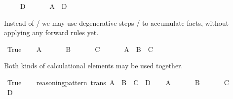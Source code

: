 \begin{isabellebody}
\ \isamarkupfalse%
\ {\isachardoublequote}{\isasymdots}\ {\isasymlongrightarrow}\ D{\isachardoublequote}\ \isamarkupfalse%
\isanewline
\ \ \isamarkupfalse%
\ \isamarkupfalse%
\ {\isachardoublequote}A\ {\isasymlongrightarrow}\ D{\isachardoublequote}\ \isamarkupfalse%
\isacommand{{\isachardot}}\isanewline
\isamarkupfalse%
\isamarkupfalse%
%
\isamarkuptrue%
%
\begin{isamarkuptext}%
Instead of / we may use degenerative steps
  / to accumulate facts, without
  applying any forward rules yet.%
\end{isamarkuptext}%
\isamarkuptrue%
\ True\isanewline
\isamarkupfalse%
\isanewline
\ \ \isamarkupfalse%
\ A\ \isamarkupfalse%
\isanewline
\ \ \isamarkupfalse%
\ \isamarkupfalse%
\ B\ \isamarkupfalse%
\isanewline
\ \ \isamarkupfalse%
\ \isamarkupfalse%
\ C\ \isamarkupfalse%
\isanewline
\ \ \isamarkupfalse%
\ \isamarkupfalse%
\ A\ \ B\ \ C\ \isamarkupfalse%
\isacommand{{\isachardot}}\ \ %
\isanewline
\isamarkupfalse%
\isamarkupfalse%
%
\begin{isamarkuptext}%
Both kinds of calculational elements may be used together.%
\end{isamarkuptext}%
\isamarkuptrue%
\ True\isanewline
\isamarkupfalse%
\isanewline
\ \ \isamarkupfalse%
\ reasoning{\isacharunderscore}pattern\ {\isacharbrackleft}trans{\isacharbrackright}{\isacharcolon}\ {\isachardoublequote}A\ {\isasymLongrightarrow}\ B\ {\isasymLongrightarrow}\ C\ {\isasymLongrightarrow}\ D{\isachardoublequote}\isanewline
\ \ \isamarkupfalse%
\ A\ \isamarkupfalse%
\isanewline
\ \ \isamarkupfalse%
\ \isamarkupfalse%
\ B\ \isamarkupfalse%
\isanewline
\ \ \isamarkupfalse%
\ \isamarkupfalse%
\ C\ \isamarkupfalse%
\isanewline
\ \ \isamarkupfalse%
\ \isamarkupfalse%
\ D\ \isamarkupfalse%
\isacommand{{\isachardot}}\isanewline

\end{isabellebody}
